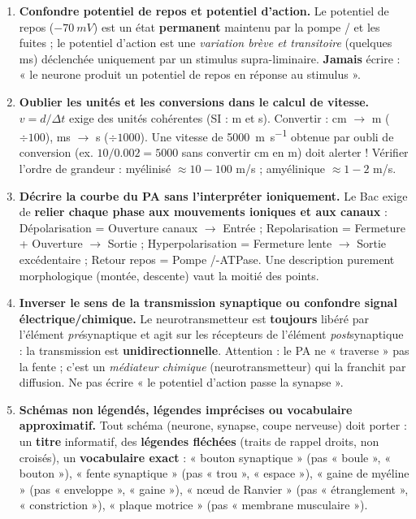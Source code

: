 \documentclass[11pt]{article}
\begin{document}
\begin{attention}
\begin{enumerate}
\item \textbf{Confondre potentiel de repos et potentiel d'action.} Le potentiel de repos ($-\SI{70}{mV}$) est un état \textbf{permanent} maintenu par la pompe / et les fuites  ; le potentiel d'action est une \emph{variation brève et transitoire} (quelques ms) déclenchée uniquement par un stimulus supra-liminaire. \textbf{Jamais} écrire : « le neurone produit un potentiel de repos en réponse au stimulus ».
\item \textbf{Oublier les unités et les conversions dans le calcul de vitesse.} $v = d/\Delta t$ exige des unités cohérentes (SI : m et s). Convertir : cm $\rightarrow$ m ($\div 100$), ms $\rightarrow$ s ($\div 1000$). Une vitesse de \SI{5000}{m.s^{-1}} obtenue par oubli de conversion (ex. $10/0.002 = 5000$ sans convertir cm en m) doit alerter ! Vérifier l'ordre de grandeur : myélinisé $\approx 10-100$ m/s ; amyélinique $\approx 1-2$ m/s.
\item \textbf{Décrire la courbe du PA sans l'interpréter ioniquement.} Le Bac exige de \textbf{relier chaque phase aux mouvements ioniques et aux canaux} : Dépolarisation = Ouverture canaux  $\rightarrow$ Entrée  ; Repolarisation = Fermeture  + Ouverture  $\rightarrow$ Sortie  ; Hyperpolarisation = Fermeture lente  $\rightarrow$ Sortie  excédentaire ; Retour repos = Pompe /-ATPase. Une description purement morphologique (montée, descente) vaut la moitié des points.
\item \textbf{Inverser le sens de la transmission synaptique ou confondre signal électrique/chimique.} Le neurotransmetteur est \textbf{toujours} libéré par l'élément \emph{pré}synaptique et agit sur les récepteurs de l'élément \emph{post}synaptique : la transmission est \textbf{unidirectionnelle}. Attention : le PA ne « traverse » pas la fente ; c'est un \emph{médiateur chimique} (neurotransmetteur) qui la franchit par diffusion. Ne pas écrire « le potentiel d'action passe la synapse ».
\item \textbf{Schémas non légendés, légendes imprécises ou vocabulaire approximatif.} Tout schéma (neurone, synapse, coupe nerveuse) doit porter : un \textbf{titre} informatif, des \textbf{légendes fléchées} (traits de rappel droits, non croisés), un \textbf{vocabulaire exact} : « bouton synaptique » (pas « boule », « bouton »), « fente synaptique » (pas « trou », « espace »), « gaine de myéline » (pas « enveloppe », « gaine »), « nœud de Ranvier » (pas « étranglement », « constriction »), « plaque motrice » (pas « membrane musculaire »).
\end{enumerate}
\end{attention}
\end{document}
